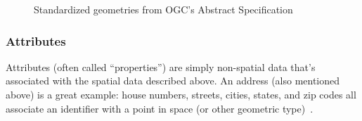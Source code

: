 \begin{figure}
    \centering

      \hfill
{}
       \hfill
      \hfill
    \caption{Standardized geometries from OGC's Abstract Specification}
    \label{fig:geoms}
    
\end{figure}

\subsubsection{Attributes}
Attributes (often called ``properties'') are simply non-spatial data that's associated with the spatial data described above. An address (also mentioned above) is a great example: house numbers, streets, cities, states, and zip codes all associate an identifier with a point in space (or other geometric type)~\cite{gentle_intro}.

